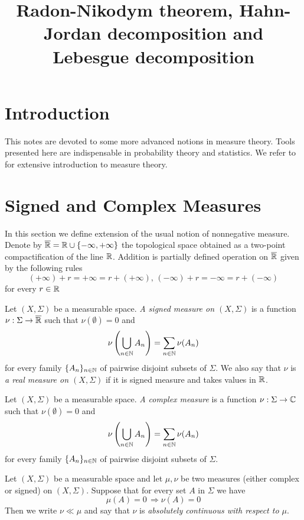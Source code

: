 




\title{Radon-Nikodym theorem, Hahn-Jordan decomposition and Lebesgue decomposition}
\date{}
\maketitle
\section{Introduction}
\noindent
This notes are devoted to some more advanced notions in measure theory. Tools presented here are indispensable in probability theory and statistics. We refer to \cite{Introductiontomeasuretheory} for extensive introduction to measure theory. 

\section{Signed and Complex Measures}
\noindent
In this section we define extension of the usual notion of nonnegative measure. Denote by $\overline{{\mathbb R}}={\mathbb R}\cup \{-\infty,+\infty\}$ the topological space obtained as a two-point compactification of the line ${\mathbb R}$. Addition is partially defined operation on $\overline{{\mathbb R}}$ given by the following rules
$$(+\infty)+r=+\infty=r+(+\infty),\,(-\infty)+r=-\infty=r+(-\infty)$$
for every $r\in {\mathbb R}$

\begin{definition}
Let $\left(X,\Sigma\right)$ be a measurable space. \textit{A signed measure on $(X,\Sigma)$} is a function $\nu:\Sigma\rightarrow \overline{{\mathbb R}}$ such that $\nu(\emptyset)=0$ and 
$$\nu\left(\bigcup_{n\in {\mathbb N}}A_n\right)=\sum_{n\in {\mathbb N}}\nu(A_n)$$
for every family $\{A_n\}_{n\in {\mathbb N}}$ of pairwise disjoint subsets of $\Sigma$. We also say that $\nu$ is \textit{a real measure on $(X,\Sigma)$} if it is signed measure and takes values in ${\mathbb R}$.
\end{definition}

\begin{definition}
Let $\left(X,\Sigma\right)$ be a measurable space. \textit{A complex measure} is a function $\nu:\Sigma\rightarrow {\mathbb C}$ such that $\nu(\emptyset)=0$ and 
$$\nu\left(\bigcup_{n\in {\mathbb N}}A_n\right)=\sum_{n\in {\mathbb N}}\nu(A_n)$$
for every family $\{A_n\}_{n\in {\mathbb N}}$ of pairwise disjoint subsets of $\Sigma$. 
\end{definition}

\begin{definition}
Let $(X,\Sigma)$ be a measurable space and let $\mu,\nu$ be two measures (either complex or signed) on $(X,\Sigma)$. Suppose that for every set $A$ in $\Sigma$ we have
$$\mu(A) = 0\,\Rightarrow \nu(A)=0$$
Then we write $\nu \ll \mu$ and say that $\nu$ is \textit{absolutely continuous with respect to $\mu$}.
\end{definition}

